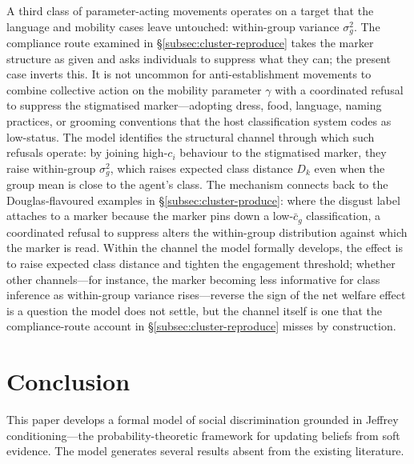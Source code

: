 \documentclass[12pt,a4paper]{article}
\theoremstyle{definition}
\numberwithin{proposition}{subsection}
\begin{document}
A third class of parameter-acting movements operates on a target that
the language and mobility cases leave untouched: within-group
variance $\sigma_g^2$. The compliance route examined in
\S\ref{subsec:cluster-reproduce} takes the marker structure as given
and asks individuals to suppress what they can; the present case
inverts this. It is not uncommon for anti-establishment movements to
combine collective action on the mobility parameter $\gamma$ with a
coordinated refusal to suppress the stigmatised marker---adopting
dress, food, language, naming practices, or grooming conventions that
the host classification system codes as low-status. The model
identifies the structural channel through which such refusals
operate: by joining high-$c_i$ behaviour to the stigmatised marker,
they raise within-group $\sigma_g^2$, which raises expected class
distance $D_k$ even when the group mean is close to the agent's
class. The mechanism connects back to the Douglas-flavoured examples
in \S\ref{subsec:cluster-produce}: where the disgust label attaches
to a marker because the marker pins down a low-$\bar{c}_g$
classification, a coordinated refusal to suppress alters the
within-group distribution against which the marker is read. Within
the channel the model formally develops, the effect is to raise
expected class distance and tighten the engagement threshold; whether
other channels---for instance, the marker becoming less informative
for class inference as within-group variance rises---reverse the sign
of the net welfare effect is a question the model does not settle,
but the channel itself is one that the compliance-route account in
\S\ref{subsec:cluster-reproduce} misses by construction.

\section{Conclusion}
\label{sec:conclusion}

This paper develops a formal model of social discrimination grounded
in Jeffrey conditioning---the probability-theoretic framework for
updating beliefs from soft evidence. The model generates several
results absent from the existing literature.
\end{document}
